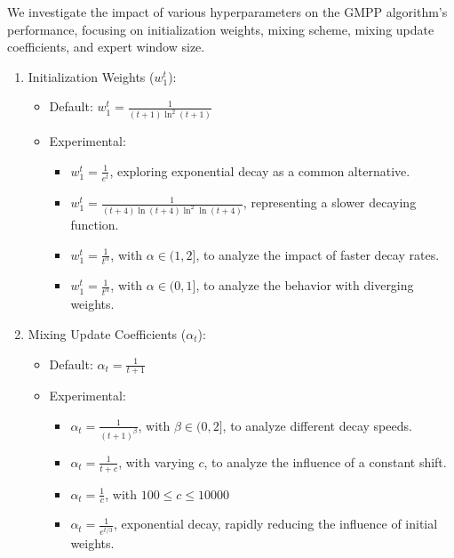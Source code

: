 \documentclass[12pt, twoside]{article}
\begin{document}
We investigate the impact of various hyperparameters on the GMPP algorithm's performance, focusing on initialization weights, mixing scheme, mixing update coefficients, and expert window size. 
\begin{enumerate}
\item Initialization Weights ($w_1^t$):
\begin{itemize}
\item Default: $w_1^t = \frac{1}{(t+1)\ln^2(t+1)}$
\item Experimental: 
\begin{itemize}
\item $w_1^t = \frac{1}{e^t}$, exploring exponential decay as a common alternative.
\item $w_1^t = \frac{1}{(t+4)\ln(t+4)\ln^2\ln(t+4)}$, representing a slower decaying function.
\item $w_1^t = \frac{1}{t^\alpha}$, with $\alpha \in (1, 2]$, to analyze the impact of faster decay rates.
\item $w_1^t = \frac{1}{t^\alpha}$, with $\alpha \in (0, 1]$, to analyze the behavior with diverging weights.


\end{itemize}
\end{itemize}



\item Mixing Update Coefficients ($\alpha_t$):
\begin{itemize}
\item Default: $\alpha_t = \frac{1}{t+1}$
\item Experimental: 
\begin{itemize}
\item $\alpha_t = \frac{1}{(t+1)^\beta}$, with $\beta \in (0, 2]$, to analyze different decay speeds.
\item $\alpha_t = \frac{1}{t+c}$, with varying $c$, to analyze the influence of a constant shift.
\item $\alpha_t = \frac{1}{c}$, with $100 \le c \le10000$
\item $\alpha_t = \frac{1}{e^{t/3}}$, exponential decay, rapidly reducing the influence of initial weights.         

\end{itemize}


\end{itemize}


\end{enumerate}
\end{document}
